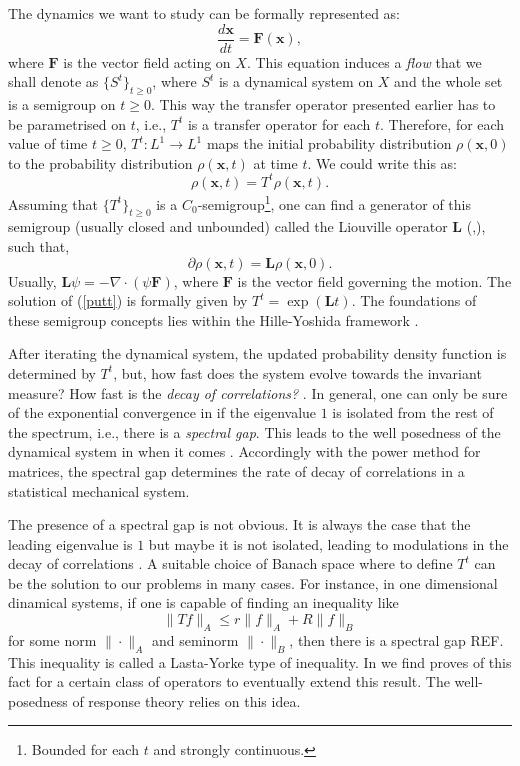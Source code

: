 The dynamics we want to study can be formally represented as:
	\begin{equation}
	\frac{d\mathbf{x}}{dt}=\mathbf{F}(\mathbf{x}),
	\end{equation}
where $\mathbf{F}$ is the vector field acting on $X$. This equation induces a \emph{flow} that we shall denote as $\{S^t\}_{t\geq 0}$, where $S^t$ is a dynamical system on $X$ and the whole set is a semigroup on $t\geq 0.$ This way the transfer operator presented earlier has to be parametrised on $t$, i.e., $T^t$ is a transfer operator for each $t$. Therefore, for each value of time $t\geq 0$, $T^t: L^1 \longrightarrow L^1$ maps the initial probability distribution $\rho(\mathbf{x},0)$ to the probability distribution $\rho(\mathbf{x},t)$ at time $t$. We could write this as:
\begin{equation}\label{keyy}
	\rho (\mathbf{x},t)= T^t\rho(\mathbf{x},t).
\end{equation}
Assuming that $\{T^t\}_{t\geq0}$ is a $C_0$-semigroup\footnote{Bounded for each $t$ and strongly continuous.}, one can find a generator of this semigroup (usually closed and unbounded) called the Liouville operator $\mathbf{L}$ (\cite{lucarini},\cite{review}), such that,
\begin{equation}\label{putt}
	\partial \rho (\mathbf{x},t)= \mathbf{L}\rho(\mathbf{x},0).
\end{equation}
Usually, $\mathbf{L}\psi=-\nabla \cdot (\psi \mathbf{F})$, where $\mathbf{F}$ is the vector field governing the motion. The solution of (\ref{putt}) is formally given by $T^t=\exp (\mathbf{L}t)$. The foundations of these semigroup concepts lies within the Hille-Yoshida framework \cite{pazy}.

After iterating the dynamical system, the updated probability density function is determined by $T^t$, but, how fast does the system evolve towards the invariant measure? How fast is the \emph{decay of correlations?} \cite{baladi}. In general, one can only be sure of the exponential convergence in if the eigenvalue $1$ is isolated from the rest of the spectrum, i.e., there is a \emph{spectral gap}. This leads to the well posedness of the dynamical system in when it comes . Accordingly with the power method for matrices, the spectral gap determines the rate of decay of correlations in a statistical mechanical system.

The presence of a spectral gap is not obvious. It is always the case that the leading eigenvalue is $1$ but maybe it is not isolated, leading to modulations in the decay of correlations \cite{chekroun}. A suitable choice of Banach space where to define $T^t$ can be the solution to our problems in many cases. For instance, in one dimensional dinamical systems, if one is capable of finding an inequality like
\begin{equation}\label{lasotayorke}
	\| Tf\|_A \leq r\|f\|_A + R\|f\|_B
\end{equation}
for some norm $\|\cdot\|_A$ and seminorm $\|\cdot \|_B$, then there is a spectral gap REF. This inequality is called a Lasta-Yorke type of inequality. In \cite{liverani} we find proves of this fact for a certain class of operators to eventually extend this result. The well-posedness of response theory relies on this idea.

